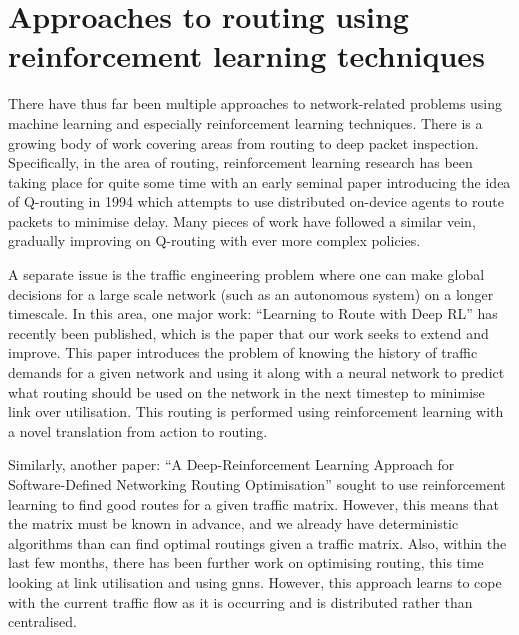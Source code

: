 \section{Approaches to routing using reinforcement learning techniques}

There have thus far been multiple approaches to network-related problems using machine learning and especially reinforcement learning techniques\cite{luong2019applications}. There is a growing body of work covering areas from routing to deep packet inspection. Specifically, in the area of routing, reinforcement learning research has been taking place for quite some time with an early seminal paper introducing the idea of Q-routing in 1994\cite{boyan1994packet} which attempts to use distributed on-device agents to route packets to minimise delay. Many pieces of work have followed a similar vein, gradually improving on Q-routing with ever more complex policies\cite{you2019toward,Ali2019HierarchicalDD}.

A separate issue is the traffic engineering problem where one can make global decisions for a large scale network (such as an autonomous system) on a longer timescale. In this area, one major work: ``Learning to Route with Deep RL''\cite{valadarsky2017learning} has recently been published, which is the paper that our work seeks to extend and improve. This paper introduces the problem of knowing the history of traffic demands for a given network and using it along with a neural network to predict what routing should be used on the network in the next timestep to minimise link over utilisation. This routing is performed using reinforcement learning with a novel translation from action to routing.

Similarly, another paper: ``A Deep-Reinforcement Learning Approach for Software-Defined Networking Routing Optimisation''\cite{stampa2017deep} sought to use reinforcement learning to find good routes for a given traffic matrix. However, this means that the matrix must be known in advance, and we already have deterministic algorithms than can find optimal routings given a traffic matrix. Also, within the last few months, there has been further work on optimising routing, this time looking at link utilisation and using \acp{gnn}\cite{Sawada2020NetworkRO}. However, this approach learns to cope with the current traffic flow as it is occurring and is distributed rather than centralised.

